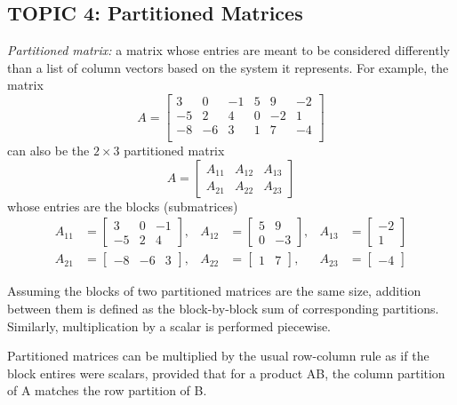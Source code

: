\documentclass[12pt]{article} %
\begin{document}
\pagebreak
\subsection{TOPIC 4: Partitioned Matrices}
\emph{Partitioned matrix:} a matrix whose entries are meant to be considered differently than a list of column vectors based on the system it represents. 
For example, the matrix 
$$A = \left[ \begin{array}{ccc|cc|c}
	3 & 0 & -1  & 5 & 9 & -2\\
	-5 & 2 & 4 & 0 & -2 & 1\\
	\hline
	-8 & -6 & 3 & 1 & 7 & -4\\	
\end{array} \right]$$
can also be the $2 \times 3$ partitioned matrix 
$$A = \begin{bmatrix}
	A_{11} & A_{12} & A_{13}\\
	A_{21} & A_{22} & A_{23}
\end{bmatrix}$$
whose entries are the blocks (submatrices)
\begin{align*}
	A_{11} &= \begin{bmatrix}
		3 & 0 & -1\\
		-5 & 2 & 4
	\end{bmatrix}, & A_{12} &= \begin{bmatrix}
		5 & 9\\
		0 & -3
	\end{bmatrix}, & A_{13} &= \begin{bmatrix}
		-2\\
		1
	\end{bmatrix}\\
	A_{21} &= \begin{bmatrix}
		-8 & -6 & 3
	\end{bmatrix}, & A_{22} &= \begin{bmatrix}
		1 & 7
	\end{bmatrix}, & A_{23} &= \begin{bmatrix}
		-4
	\end{bmatrix}
\end{align*}

Assuming the blocks of two partitioned matrices are the same size, addition between them is defined as the block-by-block sum of corresponding partitions. Similarly, multiplication by a scalar is performed piecewise. 

Partitioned matrices can be multiplied by the usual row-column rule as if the block entires were scalars, provided that for a product AB, the column partition of A matches the row partition of B. 
\end{document}
